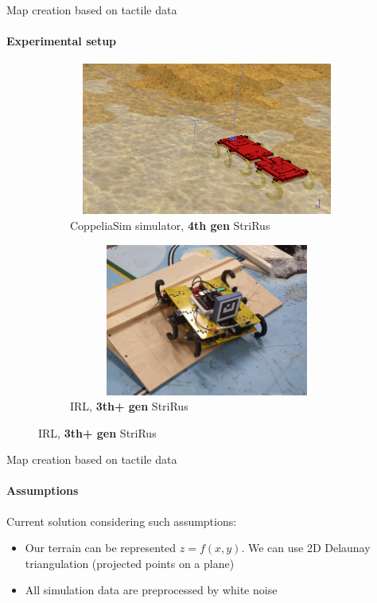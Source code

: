 \documentclass[aspectratio=169,xcolor=table]{beamer}
\begin{document}
\begin{frame}[t]{Map creation based on tactile data}
    \framesubtitle{Experimental setup}
    \vspace{-15pt}
    \begin{figure}[H]
        \begin{subfigure}[t]{0.49\textwidth}
            \centering\includegraphics[height=5cm,width=1\textwidth,keepaspectratio]{coppelia_sim.png}
            \caption*{CoppeliaSim simulator, \textbf{4th gen} StriRus}
        \end{subfigure}
        \begin{subfigure}[t]{0.49\textwidth}
            \centering\includegraphics[height=5cm,width=1\textwidth,keepaspectratio]{rl_sim.JPG}
            \caption*{IRL, \textbf{3th+ gen} StriRus}
        \end{subfigure}
    \end{figure}
\end{frame}

\begin{frame}[t]{Map creation based on tactile data}
    \framesubtitle{Assumptions}
    \large
    Current solution considering such assumptions:
    \begin{itemize}
        \item Our terrain can be represented $z = f(x,y)$. We can use 2D Delaunay triangulation (projected points on a plane)
        \item All simulation data are preprocessed by white noise
    \end{itemize}
\end{frame}
\end{document}

